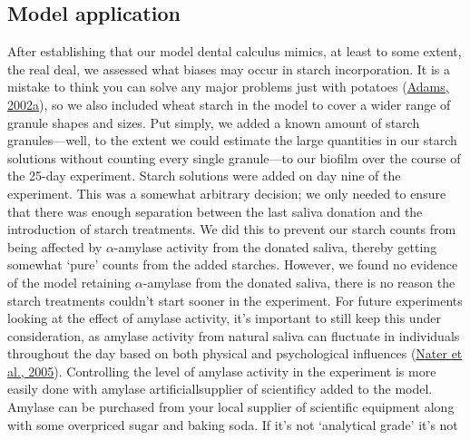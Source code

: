 \documentclass[
  b5paper,
]{book}
\begin{document}
\hypertarget{model-application}{%
\subsection{Model application}\label{model-application}}

After establishing that our model dental calculus mimics, at least to
some extent, the real deal, we assessed what biases may occur in starch
incorporation. It is a mistake to think you can solve any major problems
just with potatoes (\protect\hyperlink{ref-adamsLifeUniverse2002}{Adams,
2002a}), so we also included wheat starch in the model to cover a wider
range of granule shapes and sizes. Put simply, we added a known amount
of starch granules---well, to the extent we could estimate the large
quantities in our starch solutions without counting every single
granule---to our biofilm over the course of the 25-day experiment.
Starch solutions were added on day nine of the experiment. This was a
somewhat arbitrary decision; we only needed to ensure that there was
enough separation between the last saliva donation and the introduction
of starch treatments. We did this to prevent our starch counts from
being affected by \(\alpha\)-amylase activity from the donated saliva,
thereby getting somewhat `pure' counts from the added starches. However,
we found no evidence of the model retaining \(\alpha\)-amylase from the
donated saliva, there is no reason the starch treatments couldn't start
sooner in the experiment. For future experiments looking at the effect
of amylase activity, it's important to still keep this under
consideration, as amylase activity from natural saliva can fluctuate in
individuals throughout the day based on both physical and psychological
influences (\protect\hyperlink{ref-naterHumanAmylase2005}{Nater et al.,
2005}). Controlling the level of amylase activity in the experiment is
more easily done with amylase artificiallsupplier of scientificy added
to the model. Amylase can be purchased from your local supplier of
scientific equipment along with some overpriced sugar and baking soda.
If it's not `analytical grade' it's not
\end{document}
